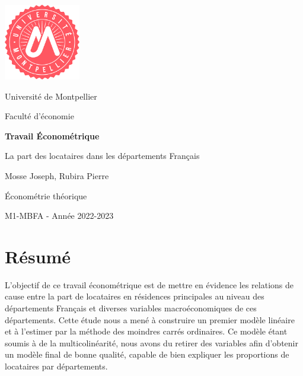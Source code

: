 \documentclass[12pt]{article}
\begin{document}
\begin{titlepage}
    \centering
    \includegraphics[width=0.25\textwidth]{um.png}\par\vspace{0.5cm}
    {\Large Université de Montpellier \par}
    {\large Faculté d'économie\par}
    \vfill
    {\huge\bfseries Travail Économétrique\par}
    \vspace{0.1cm}
    {\Large La part des locataires dans les départements Français\par}

    \vfill
    {\Large Mosse Joseph, Rubira Pierre\par}
    \vfill
    {\large Économétrie théorique \par}
    {M1-MBFA - Année 2022-2023\par}

\end{titlepage}
\pagestyle{fancy}
\fancyhead{}

\fancyhead[L]{\leftmark}
\fancyfoot{} 
\section{Résumé}
L'objectif de ce travail économétrique est de mettre en évidence les relations de cause entre la part de locataires en résidences principales au niveau des départements Français et 
diverses variables macroéconomiques de ces départements. Cette étude nous a mené à construire un premier modèle linéaire et à l'estimer par la méthode des moindres carrés ordinaires. 
Ce modèle étant soumis à de la multicolinéarité, nous avons du retirer des variables afin d'obtenir un modèle final de bonne qualité, capable de bien expliquer les proportions de 
locataires par départements.
\end{document}
